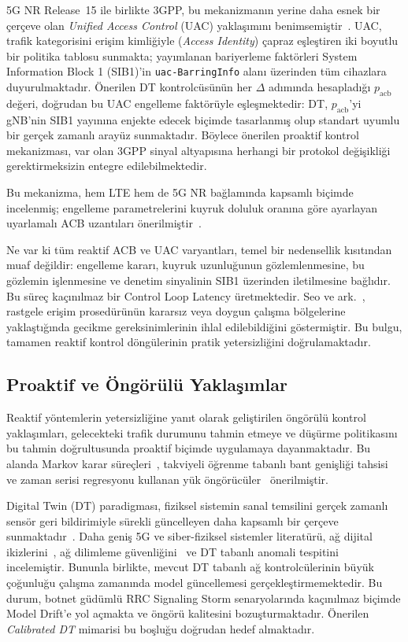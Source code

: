 \documentclass[conference]{IEEEtran}
\newcommand{\pacb}{p_{\mathrm{acb}}}
\begin{document}
5G NR Release~15 ile birlikte 3GPP, bu mekanizmanın yerine daha esnek bir
çerçeve olan \emph{Unified Access Control} (UAC) yaklaşımını
benimsemiştir~\cite{b4}. UAC, trafik kategorisini erişim kimliğiyle
(\emph{Access Identity}) çapraz eşleştiren iki boyutlu bir politika tablosu
sunmakta; yayımlanan bariyerleme faktörleri System Information Block 1
(SIB1)'in \texttt{uac-BarringInfo} alanı üzerinden tüm cihazlara
duyurulmaktadır. Önerilen DT kontrolcüsünün her $\Delta$ adımında hesapladığı
$\pacb$ değeri, doğrudan bu UAC engelleme faktörüyle eşleşmektedir: DT,
$\pacb$'yi gNB'nin SIB1 yayınına enjekte edecek biçimde tasarlanmış olup
standart uyumlu bir gerçek zamanlı arayüz sunmaktadır. Böylece önerilen
proaktif kontrol mekanizması, var olan 3GPP sinyal altyapısına herhangi bir
protokol değişikliği gerektirmeksizin entegre edilebilmektedir.

Bu mekanizma, hem LTE hem de 5G NR bağlamında kapsamlı biçimde incelenmiş;
engelleme parametrelerini kuyruk doluluk oranına göre ayarlayan uyarlamalı
ACB uzantıları önerilmiştir~\cite{b5}.

Ne var ki tüm reaktif ACB ve UAC varyantları, temel bir nedensellik kısıtından
muaf değildir: engelleme kararı, kuyruk uzunluğunun gözlemlenmesine, bu
gözlemin işlenmesine ve denetim sinyalinin SIB1 üzerinden iletilmesine
bağlıdır. Bu süreç kaçınılmaz bir Control Loop Latency üretmektedir. Seo ve
ark.~\cite{b6}, rastgele erişim prosedürünün kararsız veya doygun çalışma
bölgelerine yaklaştığında gecikme gereksinimlerinin ihlal edilebildiğini
göstermiştir. Bu bulgu, tamamen reaktif kontrol döngülerinin pratik
yetersizliğini doğrulamaktadır.

\subsection{Proaktif ve Öngörülü Yaklaşımlar}

Reaktif yöntemlerin yetersizliğine yanıt olarak geliştirilen öngörülü kontrol
yaklaşımları, gelecekteki trafik durumunu tahmin etmeye ve düşürme politikasını
bu tahmin doğrultusunda proaktif biçimde uygulamaya dayanmaktadır. Bu alanda
Markov karar süreçleri~\cite{b7}, takviyeli öğrenme tabanlı bant genişliği
tahsisi~\cite{b8} ve zaman serisi regresyonu kullanan yük öngörücüler~\cite{b9}
önerilmiştir.

Digital Twin (DT) paradigması, fiziksel sistemin sanal temsilini gerçek zamanlı
sensör geri bildirimiyle sürekli güncelleyen daha kapsamlı bir çerçeve
sunmaktadır~\cite{b10}. Daha geniş 5G ve siber-fiziksel sistemler literatürü,
ağ dijital ikizlerini~\cite{b11}, ağ dilimleme güvenliğini~\cite{b12} ve
DT tabanlı anomali tespitini~\cite{b13} incelemiştir. Bununla
birlikte, mevcut DT tabanlı ağ kontrolcülerinin büyük çoğunluğu çalışma
zamanında model güncellemesi gerçekleştirmemektedir. Bu durum, botnet güdümlü
RRC Signaling Storm senaryolarında kaçınılmaz biçimde Model Drift'e yol açmakta
ve öngörü kalitesini bozuşturmaktadır. Önerilen \emph{Calibrated DT} mimarisi
bu boşluğu doğrudan hedef almaktadır.
\end{document}
